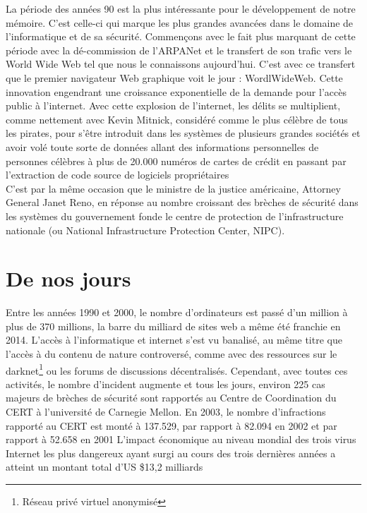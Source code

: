 \documentclass[a4paper]{memoir}
\begin{document}
La période des années 90 est la plus intéressante pour le développement de notre mémoire. C'est celle-ci qui marque les plus grandes avancées dans le domaine de l'informatique et de sa sécurité.
Commençons avec le fait plus marquant de cette période avec la dé-commission de l'ARPANet et le transfert de son trafic vers le World Wide Web tel que nous le connaissons aujourd'hui. C'est avec ce transfert que le premier navigateur Web graphique voit le jour : WordlWideWeb. Cette innovation engendrant une croissance exponentielle de la demande pour l'accès public à l'internet. Avec cette explosion de l'internet, les délits se multiplient, comme nettement avec Kevin Mitnick, considéré comme le plus célèbre de tous les pirates, pour s'être introduit dans les systèmes de plusieurs grandes sociétés et avoir volé toute sorte de données allant des informations personnelles de personnes célèbres à plus de 20.000 numéros de cartes de crédit en passant par l'extraction de code source de logiciels propriétaires \\
\noindent C'est par la même occasion que le ministre de la justice américaine, Attorney General Janet Reno, en réponse au nombre croissant des brèches de sécurité dans les systèmes du gouvernement fonde le centre de protection de l'infrastructure nationale (ou National Infrastructure Protection Center, NIPC).


\section{De nos jours}

Entre les années 1990 et 2000, le nombre d'ordinateurs est passé d'un million à plus de 370 millions, la barre du milliard de sites web a même été franchie en 2014. L'accès à l'informatique et internet s'est vu banalisé, au même titre que l'accès à du contenu de nature controversé, comme avec des ressources sur le darknet\footnote{Réseau privé virtuel anonymisé} ou les forums de discussions décentralisés.
Cependant, avec toutes ces activités, le nombre d'incident augmente et tous les jours, environ 225 cas majeurs de brèches de sécurité sont rapportés au Centre de Coordination du CERT à l'université de Carnegie Mellon.
En 2003, le nombre d'infractions rapporté au CERT est monté à 137.529, par rapport à 82.094 en 2002 et par rapport à 52.658 en 2001
L'impact économique au niveau mondial des trois virus Internet les plus dangereux ayant surgi au cours des trois dernières années a atteint un montant total d’US \$13,2 milliards\\
\end{document}
